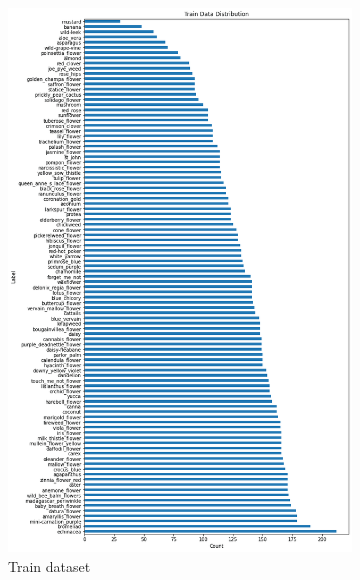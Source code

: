 \begin{figure}[ht]
  \centering
 \begin{subfigure}{.4\textwidth}
    \centering
    \includegraphics[width=\textwidth]{appendixes/images/plants-train.png}
    \caption{Train dataset}
\end{subfigure}
 \begin{subfigure}{.4\textwidth}
    \centering

\end{subfigure}
\end{figure}
